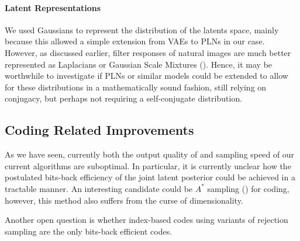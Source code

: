 \paragraph{Latent Representations}
We used Gaussians to represent the distribution of the latents space, mainly
because this allowed a simple extension from VAEs to PLNs in our case. However,
as discussed earlier, filter responses of natural images are much better
represented as Laplacians or Gaussian Scale Mixtures (\cite{portilla2003image}).
Hence, it may be worthwhile to investigate if PLNs or similar models could be
extended to allow for these distributions in a mathematically sound fashion,
still relying on conjugacy, but perhaps not requiring a self-conjugate distribution.

\subsection{Coding Related Improvements}
\par
As we have seen, currently both the output quality of and sampling speed of our
current algorithms are suboptimal. In particular, it is currently unclear how the
postulated bits-back efficiency of the joint latent posterior could be achieved
in a tractable manner. An interesting candidate could be $A^*$ sampling
(\cite{maddison2014sampling}) for coding, however, this method also suffers from
the curse of dimensionality.

\par
Another open question is whether index-based codes using variants of rejection
sampling are the only bits-back efficient codes.